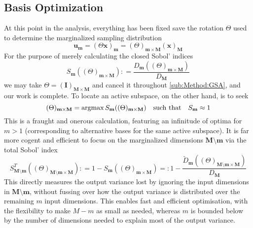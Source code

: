 \documentclass[preprint,12pt]{elsarticle}
\newcommand*{\M}[1]{\ensuremath{#1}\xspace}
\newcommand*{\vr}[1]{\M{\mathbf{#1}}}
\newcommand*{\deq}{\M{\mathrel{\mathop:}=}}
\newcommand*{\deqr}{\M{=\mathrel{\mathop:}}}
\newcommand{\T}[1]{\text{#1}}
\newcommand*{\QT}[2][]{\M{\quad\T{#2}\ifthenelse{\equal{#1}{}}{\quad}{#1}}}
\DeclareMathOperator*{\argmax}{argmax}
\begin{document}
        \subsection{Basis Optimization} \label{sub:Method:BO}
            At this point in the analysis, everything has been fixed save the rotation $\Theta$ used to determine the marginalized sampling distribution
            \begin{equation*}
                \vr{u}_{\vr{m}} = (\Theta\vr{x})_{\vr{m}} = (\Theta)_{\vr{m}\times\vr{M}} (\vr{x})_{\vr{M}} 
            \end{equation*}
            For the purpose of merely calculating the closed Sobol' indices 
            \begin{equation} \label{eq:Method:BO:SDef}
                S_{\vr{m}}((\Theta)_{\vr{m}\times\vr{M}}) \deq \frac{D_{\vr{m}}((\Theta)_{\vr{m}\times\vr{M}})}{D_{\vr{M}}} 
            \end{equation}
            we may take $\Theta = (\vr{I})_{\vr{M}\times\vr{M}}$ and cancel it throughout \cref{sub:Method:GSA}, and our work is complete. 
            To locate an active subspace, on the other hand, is to seek
            \begin{equation} \label{eq:Method:BO:OptimalRow}
                (\Theta)_{\vr{m}\times\vr{M}} = \argmax S_{\vr{m}}((\Theta)_{\vr{m}\times\vr{M}}) \QT{such that} S_{\vr{m}} \approx 1
            \end{equation}
            This is a fraught and onerous calculation, featuring an infinitude of optima for $m>1$ (corresponding to alternative bases for the same active subspace). It is far more cogent and efficient to focus on the marginalized dimensions $\vr{M}\setminus\vr{m}$ via the total Sobol' index
            \begin{equation} \label{eq:Method:BO:StotDef}
                S_{\vr{M}\setminus\vr{m}}^{T}((\Theta)_{\vr{M}\setminus\vr{m}\times\vr{M}}) \deq 1 - S_{\vr{m}}((\Theta)_{\vr{m}\times\vr{M}}) \deqr 1 - \frac{\tilde{D}_{\vr{m}}((\Theta)_{\vr{M}\setminus\vr{m}\times\vr{M}})}{D_{\vr{M}}}
            \end{equation}
            This directly measures the output variance lost by ignoring the input dimensions in $\vr{M}\setminus\vr{m}$, without fussing over how the output variance is distributed over the remaining $m$ input dimensions.
            This enables fast and efficient optimisation, with the flexibility to make $M-m$ as small as needed, whereas $m$ is bounded below by the number of dimensions needed to explain most of the output variance.
\end{document}
